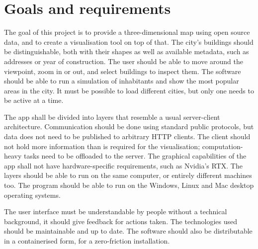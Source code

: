 \chapter{Goals and requirements}

The goal of this project is to provide a three-dimensional map using open source data, and to create a visualisation tool on top of that. The city's buildings should be distinguishable, both with their shapes as well as available metadata, such as addresses or year of construction. The user should be able to move around the viewpoint, zoom in or out, and select buildings to inspect them. The software should be able to run a simulation of inhabitants and show the most popular areas in the city. It must be possible to load different cities, but only one needs to be active at a time.

The app shall be divided into layers that resemble a usual server-client architecture. Communication should be done using standard public protocols, but data does not need to be published to arbitrary HTTP clients. The client should not hold more information than is required for the visualisation; computation-heavy tasks need to be offloaded to the server. The graphical capabilities of the app shall not have hardware-specific requirements, such as Nvidia's RTX. The layers should be able to run on the same computer, or entirely different machines too. The program should be able to run on the Windows, Linux and Mac desktop operating systems.

The user interface must be understandable by people without a technical background, it should give feedback for actions taken. The technologies used should be maintainable and up to date. The software should also be distributable in a containerised form, for a zero-friction installation.